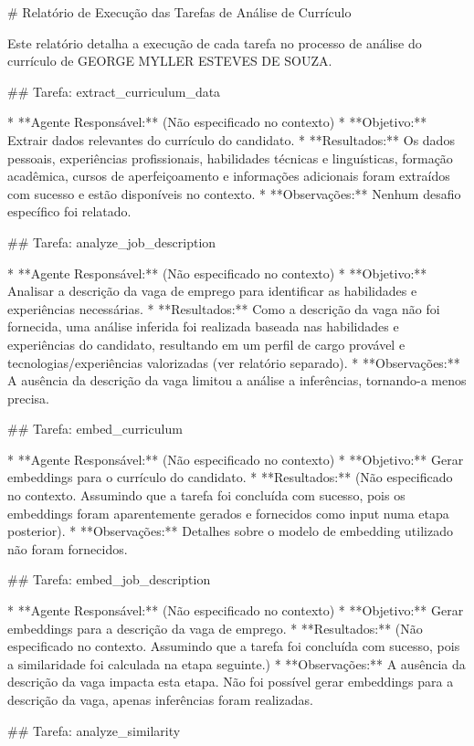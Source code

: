 # Relatório de Execução das Tarefas de Análise de Currículo

Este relatório detalha a execução de cada tarefa no processo de análise do currículo de GEORGE MYLLER ESTEVES DE SOUZA.

## Tarefa: extract_curriculum_data

* **Agente Responsável:**  (Não especificado no contexto)
* **Objetivo:** Extrair dados relevantes do currículo do candidato.
* **Resultados:** Os dados pessoais, experiências profissionais, habilidades técnicas e linguísticas, formação acadêmica, cursos de aperfeiçoamento e informações adicionais foram extraídos com sucesso e estão disponíveis no contexto.
* **Observações:** Nenhum desafio específico foi relatado.

## Tarefa: analyze_job_description

* **Agente Responsável:** (Não especificado no contexto)
* **Objetivo:** Analisar a descrição da vaga de emprego para identificar as habilidades e experiências necessárias.
* **Resultados:**  Como a descrição da vaga não foi fornecida, uma análise inferida foi realizada baseada nas habilidades e experiências do candidato, resultando em um perfil de cargo provável e tecnologias/experiências valorizadas (ver relatório separado).
* **Observações:** A ausência da descrição da vaga limitou a análise a inferências, tornando-a menos precisa.

## Tarefa: embed_curriculum

* **Agente Responsável:** (Não especificado no contexto)
* **Objetivo:** Gerar embeddings para o currículo do candidato.
* **Resultados:**  (Não especificado no contexto.  Assumindo que a tarefa foi concluída com sucesso, pois os embeddings foram aparentemente gerados e fornecidos como input numa etapa posterior).
* **Observações:** Detalhes sobre o modelo de embedding utilizado não foram fornecidos.

## Tarefa: embed_job_description

* **Agente Responsável:** (Não especificado no contexto)
* **Objetivo:** Gerar embeddings para a descrição da vaga de emprego.
* **Resultados:** (Não especificado no contexto. Assumindo que a tarefa foi concluída com sucesso, pois a similaridade foi calculada na etapa seguinte.)
* **Observações:**  A ausência da descrição da vaga impacta esta etapa.  Não foi possível gerar embeddings para a descrição da vaga, apenas inferências foram realizadas.

## Tarefa: analyze_similarity

